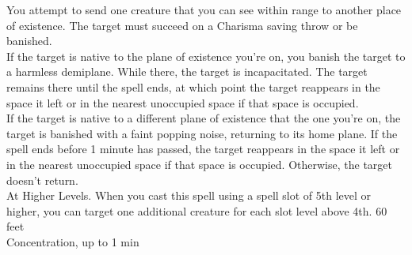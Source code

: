 \documentclass{article}
\begin{document}
    {You attempt to send one creature that you can see within range to another place of existence. The target must succeed on a Charisma saving throw or be banished.
    \\[1mm]
    If the target is native to the plane of existence you’re on, you banish the target to a harmless demiplane. While there, the target is incapacitated. The target remains there until the spell ends, at which point the target reappears in the space it left or in the nearest unoccupied space if that space is occupied.
    \\[1mm]
    If the target is native to a different plane of existence that the one you’re on, the target is banished with a faint popping noise, returning to its home plane. If the spell ends before 1 minute has passed, the target reappears in the space it left or in the nearest unoccupied space if that space is occupied. Otherwise, the target doesn’t return.
    \\[1mm]
    At Higher Levels. When you cast this spell using a spell slot of 5th level or higher, you can target one additional creature for each slot level above 4th.}
    {60 feet\\Concentration, up to 1 min}%
%
%
    
\removespace

%
%
%
%
%
%

    
        
    
    
    
    
\end{document}
